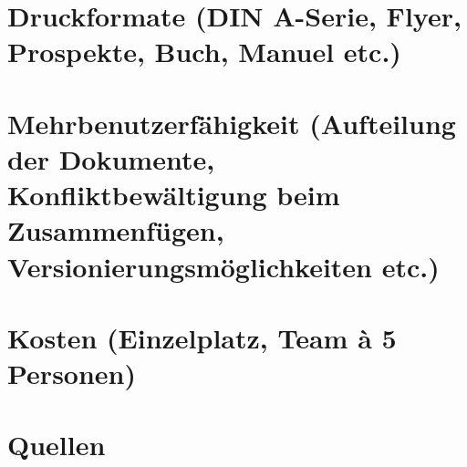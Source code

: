 \documentclass{scrartcl}
\begin{document}
\section{Druckformate (DIN A-Serie, Flyer, Prospekte, Buch, Manuel etc.)}

\section{Mehrbenutzerfähigkeit (Aufteilung der Dokumente, Konfliktbewältigung beim Zusammenfügen,
Versionierungsmöglichkeiten etc.)}

\section{Kosten (Einzelplatz, Team à 5 Personen)}

\section{Quellen}
\end{document}
